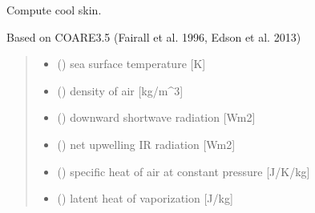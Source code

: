 \documentclass[letterpaper,10pt,english]{sphinxmanual}
\begin{document}
\begin{fulllineitems}
\label{\detokenize{users_guide:AirSeaFluxCode.cs_wl_subs.cs_C35}}
\pysigstartsignatures
{}
\pysigstopsignatures
\sphinxAtStartPar
Compute cool skin.

\sphinxAtStartPar
Based on COARE3.5 (Fairall et al. 1996, Edson et al. 2013)
\begin{quote}\begin{description}
\begin{itemize}
\item {} 
\sphinxAtStartPar
{} () \textendash{} sea surface temperature      {[}K{]}

\item {} 
\sphinxAtStartPar
{} () \textendash{} density of air               {[}kg/m\textasciicircum{}3{]}

\item {} 
\sphinxAtStartPar
{} () \textendash{} downward shortwave radiation {[}Wm\sphinxhyphen{}2{]}

\item {} 
\sphinxAtStartPar
{} () \textendash{} net upwelling IR radiation       {[}Wm\sphinxhyphen{}2{]}

\item {} 
\sphinxAtStartPar
{} () \textendash{} specific heat of air at constant pressure {[}J/K/kg{]}

\item {} 
\sphinxAtStartPar
{} () \textendash{} latent heat of vaporization   {[}J/kg{]}


\end{itemize}
\end{description}
\end{quote}
\end{fulllineitems}
\end{document}
